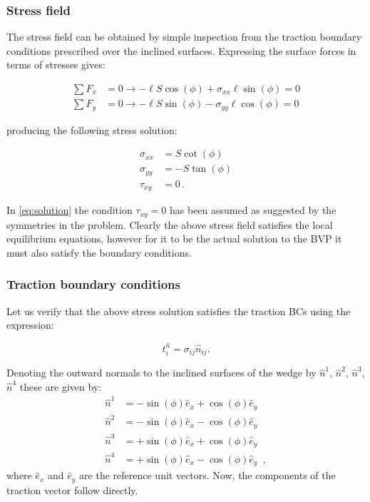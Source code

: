 \subsubsection*{Stress field}

The stress field can be obtained by simple inspection from the traction boundary conditions prescribed over the inclined surfaces. Expressing the surface forces in terms of stresses gives:

\begin{align*}
\sum F_x &= 0 \longrightarrow - \ell S\cos(\phi)  + \sigma_{xx}\ell \sin(\phi) = 0\\
\sum F_y &= 0 \longrightarrow - \ell S\sin(\phi) - \sigma_{yy}\ell \cos(\phi)=0
\end{align*}

producing the following stress solution:

\begin{equation}
\begin{aligned}
\sigma_{xx}& = S \cot(\phi)\\
\sigma_{yy}& = -S\tan(\phi)\\
\tau_{xy}& = 0\, .
\end{aligned}
\label{eq:solution}
\end{equation}

In \cref{eq:solution} the condition $\tau_{xy}=0$ has been assumed  as suggested by the symmetries in the problem. Clearly the above stress field satisfies the local equilibrium equations, however for it to be the actual solution to the BVP it must also satisfy the boundary conditions.

\subsubsection*{Traction boundary conditions}
Let us verify that the above stress solution satisfies the traction BCs using the expression:

\[t_i^{\hat n} = \sigma_{ij} \hat n_{ij}.\]

Denoting the outward normals to the inclined surfaces of the wedge by $\hat{n}^1$,  $\hat{n}^2$, $\hat{n}^3$, $\hat{n}^4$ these are given by:
\begin{align*}
\hat{n}^1 &= -\sin(\phi)\hat{e}_{x}+\cos(\phi)\hat{e}_{y}\\
\hat{n}^2 &= -\sin(\phi)\hat{e}_{x}-\cos(\phi)\hat{e}_{y}\\
\hat{n}^3 &= +\sin(\phi)\hat{e}_{x}+\cos(\phi)\hat{e}_{y}\\
\hat{n}^4 &= +\sin(\phi)\hat{e}_{x}-\cos(\phi)\hat{e}_{y} \enspace ,
\end{align*}
where $\hat{e}_{x}$ and $\hat{e}_{y}$ are the reference unit vectors. Now, the components of the traction vector follow directly.

